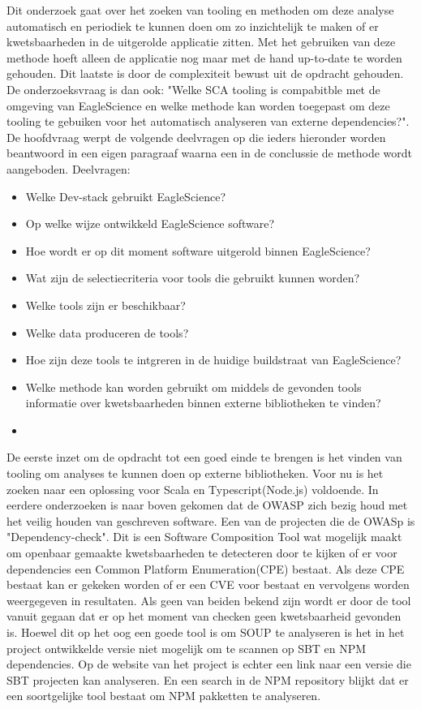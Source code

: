 Dit onderzoek gaat over het zoeken van tooling en methoden om deze analyse automatisch en periodiek te kunnen doen om zo inzichtelijk te maken of er kwetsbaarheden in de uitgerolde applicatie zitten. Met het gebruiken van deze methode hoeft alleen de applicatie nog maar met de hand up-to-date te worden gehouden. Dit laatste is door de complexiteit bewust uit de opdracht gehouden. De onderzoeksvraag is dan ook: "Welke SCA tooling is compabitble met de omgeving van EagleScience en welke methode kan worden toegepast om deze tooling te gebuiken voor het automatisch analyseren van externe dependencies?". De hoofdvraag werpt de volgende deelvragen op die ieders hieronder worden beantwoord in een eigen paragraaf waarna een in de conclussie de methode wordt aangeboden.
Deelvragen:
\begin{itemize}
    \item Welke Dev-stack gebruikt EagleScience?
    \item Op welke wijze ontwikkeld EagleScience software?
    \item Hoe wordt er op dit moment software uitgerold binnen EagleScience?
    \item Wat zijn de selectiecriteria voor tools die gebruikt kunnen worden?
    \item Welke tools zijn er beschikbaar?
    \item Welke data produceren de tools?
    \item Hoe zijn deze tools te intgreren in de huidige buildstraat van EagleScience?
    \item Welke methode kan worden gebruikt om middels de gevonden tools informatie over kwetsbaarheden binnen externe bibliotheken te vinden?
    \item
\end{itemize}




De eerste inzet om de opdracht tot een goed einde te brengen is het vinden van tooling om analyses te kunnen doen op externe bibliotheken. Voor nu is het zoeken naar een oplossing voor Scala en Typescript(Node.js) voldoende. In eerdere onderzoeken is naar boven gekomen dat de OWASP zich bezig houd met het veilig houden van geschreven software. Een van de projecten die de OWASp is "Dependency-check". Dit is een Software Composition Tool wat mogelijk maakt om openbaar gemaakte kwetsbaarheden te detecteren door te kijken of er voor dependencies een Common Platform Enumeration(CPE) bestaat. Als deze CPE bestaat kan er gekeken worden of er een CVE voor bestaat en vervolgens worden weergegeven in resultaten. Als geen van beiden bekend zijn wordt er door de tool vanuit gegaan dat er op het moment van checken geen kwetsbaarheid gevonden is. Hoewel dit op het oog een goede tool is om SOUP te analyseren is het in het project ontwikkelde versie niet mogelijk om te scannen op SBT en NPM dependencies. Op de website van het project is echter een link naar een versie die SBT projecten kan analyseren. En een search in de NPM repository blijkt dat er een soortgelijke tool bestaat om NPM pakketten te analyseren.


